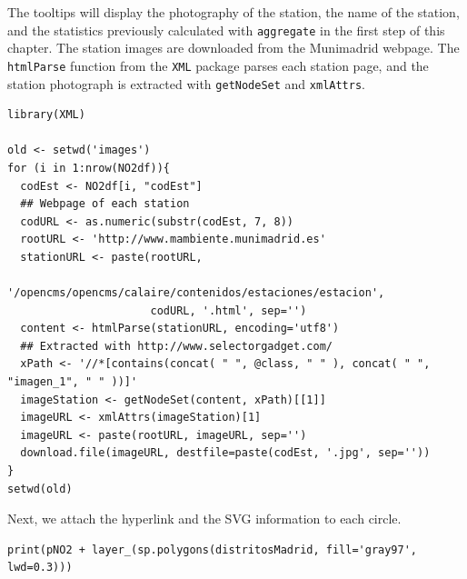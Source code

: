 \documentclass[smallroyalvopaper]{memoir}
\begin{document}
The tooltips will display the photography of the station, the name of
the station, and the statistics previously calculated with \texttt{aggregate}
in the first step of this chapter.  The station images are downloaded
from the Munimadrid webpage. The \texttt{htmlParse} function from the \texttt{XML}
package parses each station page, and the station photograph is
extracted with \texttt{getNodeSet} and \texttt{xmlAttrs}.


\lstset{language=R,numbers=none}
\begin{lstlisting}
library(XML)

old <- setwd('images')
for (i in 1:nrow(NO2df)){
  codEst <- NO2df[i, "codEst"]
  ## Webpage of each station
  codURL <- as.numeric(substr(codEst, 7, 8))
  rootURL <- 'http://www.mambiente.munimadrid.es'
  stationURL <- paste(rootURL,
                      '/opencms/opencms/calaire/contenidos/estaciones/estacion',
                      codURL, '.html', sep='')
  content <- htmlParse(stationURL, encoding='utf8')
  ## Extracted with http://www.selectorgadget.com/
  xPath <- '//*[contains(concat( " ", @class, " " ), concat( " ", "imagen_1", " " ))]'
  imageStation <- getNodeSet(content, xPath)[[1]]
  imageURL <- xmlAttrs(imageStation)[1]
  imageURL <- paste(rootURL, imageURL, sep='')
  download.file(imageURL, destfile=paste(codEst, '.jpg', sep=''))
}
setwd(old)
\end{lstlisting}

Next, we attach the hyperlink and the SVG information to each
circle.



\lstset{language=R,numbers=none}
\begin{lstlisting}
print(pNO2 + layer_(sp.polygons(distritosMadrid, fill='gray97', lwd=0.3)))
\end{lstlisting}
\end{document}
